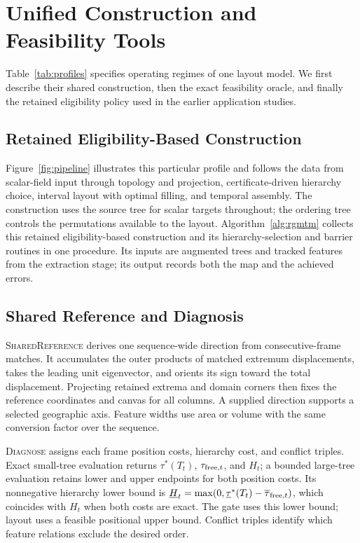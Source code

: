 \section{Unified Construction and Feasibility Tools}\label{sec:method}

Table~\ref{tab:profiles} specifies operating regimes of one layout model. We first describe their shared construction, then the exact feasibility oracle, and finally the retained eligibility policy used in the earlier application studies.

\subsection{Retained Eligibility-Based Construction}
Figure~\ref{fig:pipeline} illustrates this particular profile and follows the data from scalar-field input through topology and projection, certificate-driven hierarchy choice, interval layout with optimal filling, and temporal assembly. The construction uses the source tree for scalar targets throughout; the ordering tree controls the permutations available to the layout.
Algorithm~\ref{alg:rgmtm} collects this retained eligibility-based construction and its hierarchy-selection and barrier routines in one procedure. Its inputs are augmented trees and tracked features from the extraction stage; its output records both the map and the achieved errors.


\subsection{Shared Reference and Diagnosis}\label{sec:reference}
\textsc{SharedReference} derives one sequence-wide direction from consecutive-frame matches. It accumulates the outer products of matched extremum displacements, takes the leading unit eigenvector, and orients its sign toward the total displacement. Projecting retained extrema and domain corners then fixes the reference coordinates and canvas for all columns. A supplied direction supports a selected geographic axis. Feature widths use area or volume with the same conversion factor over the sequence.

\textsc{Diagnose} assigns each frame position costs, hierarchy cost, and conflict triples. Exact small-tree evaluation returns $\tau^*(T_t)$, $\tau_{\mathrm{free},t}$, and $H_t$; a bounded large-tree evaluation retains lower and upper endpoints for both position costs. Its nonnegative hierarchy lower bound is $\underline H_t=\max(0,\underline\tau^*(T_t)-\overline\tau_{\mathrm{free},t})$, which coincides with $H_t$ when both costs are exact. The gate uses this lower bound; layout uses a feasible positional upper bound. Conflict triples identify which feature relations exclude the desired order.

